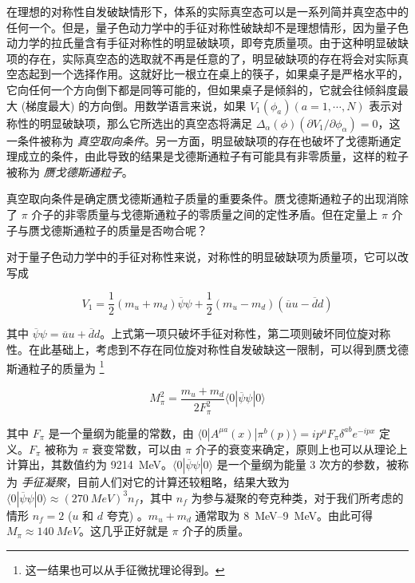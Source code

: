 在理想的对称性自发破缺情形下，体系的实际真空态可以是一系列简并真空态中的任何一个。但是，量子色动力学中的手征对称性破缺却不是理想情形，因为量子色动力学的拉氏量含有手征对称性的明显破缺项，即夸克质量项。由于这种明显破缺项的存在，实际真空态的选取就不再是任意的了，明显破缺项的存在将会对实际真空态起到一个选择作用。这就好比一根立在桌上的筷子，如果桌子是严格水平的，它向任何一个方向倒下都是同等可能的，但如果桌子是倾斜的，它就会往倾斜度最大 (梯度最大) 的方向倒。用数学语言来说，如果 $V_1(\phi_a) (a=1, \cdots, N)$ 表示对称性的明显破缺项，那么它所选出的真空态将满足 $\Delta_\alpha(\phi) (\partial V_1/\partial \phi_\alpha)=0$，这一条件被称为 \emph{真空取向条件}。另一方面，明显破缺项的存在也破坏了戈德斯通定理成立的条件，由此导致的结果是戈德斯通粒子有可能具有非零质量，这样的粒子被称为 \emph{赝戈德斯通粒子}。

真空取向条件是确定赝戈德斯通粒子质量的重要条件。赝戈德斯通粒子的出现消除了 $\pi$ 介子的非零质量与戈德斯通粒子的零质量之间的定性矛盾。但在定量上 $\pi$ 介子与赝戈德斯通粒子的质量是否吻合呢？

对于量子色动力学中的手征对称性来说，对称性的明显破缺项为质量项，它可以改写成

\begin{equation}
    V_1 = \frac{1}{2} (m_u+m_d) \overline{\psi} \psi + \frac{1}{2} (m_u-m_d) (\overline{u}u-\overline{d}d)
\end{equation}

\noindent 其中 $\overline{\psi}\psi=\overline{u}u+\overline{d}d$。上式第一项只破坏手征对称性，第二项则破坏同位旋对称性。在此基础上，考虑到不存在同位旋对称性自发破缺这一限制，可以得到赝戈德斯通粒子的质量为 \footnote{这一结果也可以从手征微扰理论得到。}

\begin{equation}
    M_{\pi}^2 = \frac{m_u+m_d}{2 F_{\pi}^2} \langle 0 | \overline{\psi}\psi | 0\rangle
\end{equation}

\noindent 其中 $F_\pi$ 是一个量纲为能量的常数，由 $\langle 0 | A^{\mu a}(x) | \pi^b(p) \rangle = i p^\mu F_\pi \delta^{ab} e^{-ipx}$ 定义。$F_\pi$ 被称为 $\pi$ 衰变常数，可以由 $\pi$ 介子的衰变来确定，原则上也可以从理论上计算出，其数值约为 \qty{9214}{MeV}。$\langle 0 | \overline{\psi}\psi | 0 \rangle$ 是一个量纲为能量 $3$ 次方的参数，被称为 \emph{手征凝聚}，目前人们对它的计算还较粗略，结果大致为 $\langle 0 | \overline{\psi}\psi | 0 \rangle \approx (\qty{270}{MeV})^3 n_f$，其中 $n_f$ 为参与凝聚的夸克种类，对于我们所考虑的情形 $n_f=2$ ($u$ 和 $d$ 夸克) 。$m_u+m_d$ 通常取为 \qtyrange{8}{9}{MeV}。由此可得 $M_\pi\approx\qty{140}{MeV}$。这几乎正好就是 $\pi$ 介子的质量。


